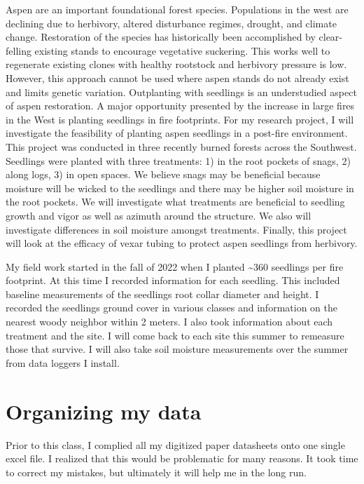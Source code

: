\documentclass[
]{book}
\begin{document}
Aspen are an important foundational forest species. Populations in the west are
declining due to herbivory, altered disturbance regimes, drought, and climate
change. Restoration of the species has historically been accomplished by
clear-felling existing stands to encourage vegetative suckering. This works well
to regenerate existing clones with healthy rootstock and herbivory pressure is
low. However, this approach cannot be used where aspen stands do not already
exist and limits genetic variation. Outplanting with seedlings is an
understudied aspect of aspen restoration. A major opportunity presented by the
increase in large fires in the West is planting seedlings in fire footprints.
For my research project, I will investigate the feasibility of planting aspen
seedlings in a post-fire environment. This project was conducted in three
recently burned forests across the Southwest. Seedlings were planted with
three treatments: 1) in the root pockets of snags, 2) along logs, 3) in open
spaces. We believe snags may be beneficial because moisture will be wicked to
the seedlings and there may be higher soil moisture in the root pockets. We will
investigate what treatments are beneficial to seedling growth and vigor as well
as azimuth around the structure. We also will investigate differences in soil
moisture amongst treatments. Finally, this project will look at the efficacy of
vexar tubing to protect aspen seedlings from herbivory.

My field work started in the fall of 2022 when I planted \textasciitilde360 seedlings per
fire footprint. At this time I recorded information for each
seedling. This included baseline measurements of the seedlings root collar
diameter and height. I recorded the seedlings ground cover in various classes
and information on the nearest woody neighbor within 2 meters. I also took
information about each treatment and the site. I will come back to each site
this summer to remeasure those that survive. I will also take soil moisture
measurements over the summer from data loggers I install.

\hypertarget{organizing-my-data}{%
\section{Organizing my data}\label{organizing-my-data}}

Prior to this class, I complied all my digitized paper datasheets onto one
single excel file. I realized that this would be problematic for many reasons.
It took time to correct my mistakes, but ultimately it will help me in the long
run.
\end{document}
